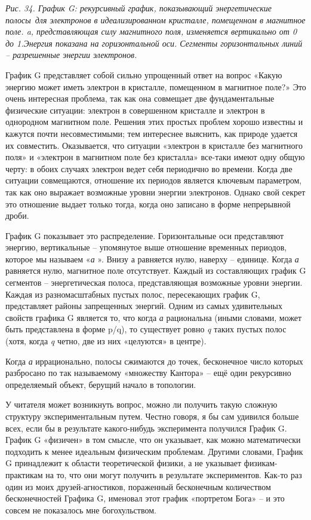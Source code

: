 \documentclass[../main.tex]{subfiles}
\begin{document}
\emph{Рис. 34. График G: рекурсивный график, показывающий энергетические полосы~для электронов в идеализированном кристалле, помещенном в магнитное поле. a, представляющая силу магнитного поля, изменяется вертикально от 0 до 1.Энергия показана на горизонтальной оси. Сегменты горизонтальных линий \--- разрешенные энергии электронов.}

График G представляет собой сильно упрощенный ответ на вопрос «Какую энергию может иметь электрон в кристалле, помещенном в магнитное поле?» Это очень интересная проблема, так как она совмещает две фундаментальные физические ситуации: электрон в совершенном кристалле и электрон в однородном магнитном поле. Решения этих простых проблем хорошо известны и кажутся почти несовместимыми; тем интереснее выяснить, как природе удается их совместить. Оказывается, что ситуации «электрон в кристалле без магнитного поля» и «электрон в магнитном поле без кристалла» все-таки имеют одну общую черту: в обоих случаях электрон ведет себя периодично во времени. Когда две ситуации совмещаются, отношение их периодов является ключевым параметром, так как оно выражает возможные уровни энергии электронов. Однако свой секрет это отношение выдает только тогда, когда оно записано в форме непрерывной дроби.

График G показывает это распределение. Горизонтальные оси представляют энергию, вертикальные \--- упомянутое выше отношение временных периодов, которое мы называем «\emph{а} ». Внизу а равняется нулю, наверху \--- единице. Когда \emph{а} равняется нулю, магнитное поле отсутствует. Каждый из составляющих график G сегментов \--- энергетическая полоса, представляющая возможные уровни энергии. Каждая из разномасштабных пустых полос, пересекающих график G, представляет районы запрещенных энергий. Одним из самых удивительных свойств графика G является то, что когда \emph{а} рациональна (иными словами, может быть представлена в форме p/q), то существует ровно \emph{q} таких пустых полос (хотя, когда \emph{q} четно, две из них «целуются» в центре).

Когда \emph{а} иррационально, полосы сжимаются до точек, бесконечное число которых разбросано по так называемому «множеству Кантора» \--- ещё один рекурсивно определяемый объект, берущий начало в топологии.

У читателя может возникнуть вопрос, можно ли получить такую сложную структуру экспериментальным путем. Честно говоря, я бы сам удивился больше всех, если бы в результате какого-нибудь эксперимента получился График G. График G «физичен» в том смысле, что он указывает, как можно математически подходить к менее идеальным физическим проблемам. Другими словами, График G принадлежит к области теоретической физики, а не указывает физикам-практикам на то, что они могут получить в результате экспериментов. Как-то раз один из моих друзей-агностиков, пораженный бесконечным количеством бесконечностей Графика G, именовал этот график «портретом Бога» \--- и это совсем не показалось мне богохульством.
\end{document}
